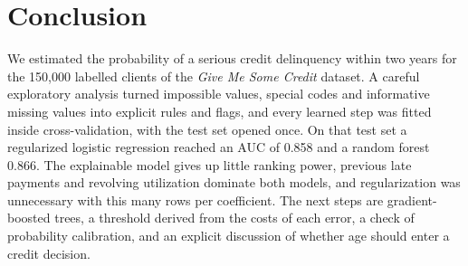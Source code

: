 \section{Conclusion}
\label{sec:conclusion}
We estimated the probability of a serious credit delinquency within two years
for the 150{,}000 labelled clients of the \emph{Give Me Some Credit} dataset.
A careful exploratory analysis turned impossible values, special codes and
informative missing values into explicit rules and flags, and every learned
step was fitted inside cross-validation, with the test set opened once. On
that test set a regularized logistic regression reached an AUC of 0.858 and a
random forest 0.866. The explainable model gives up little ranking power,
previous late payments and revolving utilization dominate both models, and
regularization was unnecessary with this many rows per coefficient. The next
steps are gradient-boosted trees, a threshold derived from the costs of each
error, a check of probability calibration, and an explicit discussion of
whether age should enter a credit decision.
